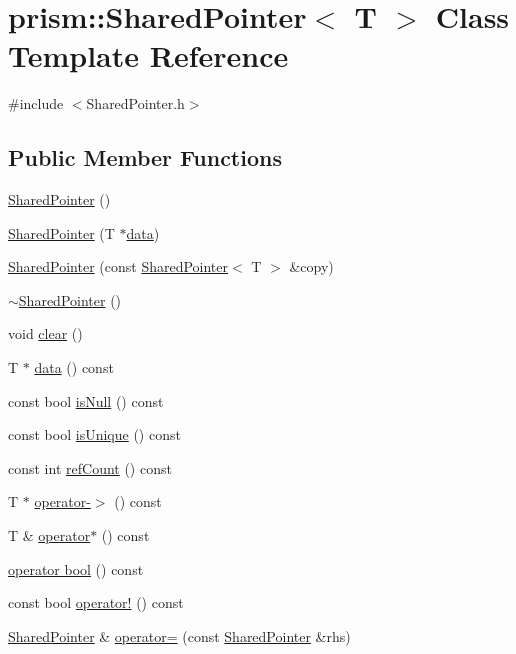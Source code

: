 \hypertarget{classprism_1_1_shared_pointer}{}\section{prism\+:\+:Shared\+Pointer$<$ T $>$ Class Template Reference}
\label{classprism_1_1_shared_pointer}


{\ttfamily \#include $<$Shared\+Pointer.\+h$>$}

\subsection*{Public Member Functions}
\begin{DoxyCompactItemize}
\item 
\hyperlink{classprism_1_1_shared_pointer_a076711618f299e5a5d04261d7d806aff}{Shared\+Pointer} ()
\item 
\hyperlink{classprism_1_1_shared_pointer_a0b8d1327178383b39bd6bb2826d384b4}{Shared\+Pointer} (T $\ast$\hyperlink{classprism_1_1_shared_pointer_aecf5f8614d4c5683e6c0207436ed8900}{data})
\item 
\hyperlink{classprism_1_1_shared_pointer_a7346c06b6c0e7c80236472c4d085460c}{Shared\+Pointer} (const \hyperlink{classprism_1_1_shared_pointer}{Shared\+Pointer}$<$ T $>$ \&copy)
\item 
\hyperlink{classprism_1_1_shared_pointer_a9892f1a766b66491af8a7356cb574ac3}{$\sim$\+Shared\+Pointer} ()
\item 
void \hyperlink{classprism_1_1_shared_pointer_a70f571a23e5c800d43f309cea9857360}{clear} ()
\item 
T $\ast$ \hyperlink{classprism_1_1_shared_pointer_aecf5f8614d4c5683e6c0207436ed8900}{data} () const 
\item 
const bool \hyperlink{classprism_1_1_shared_pointer_a011b5c5b151717cfcc45bce7eb969254}{is\+Null} () const 
\item 
const bool \hyperlink{classprism_1_1_shared_pointer_ad0eef18b3e5c37274f22cff8b88f7d66}{is\+Unique} () const 
\item 
const int \hyperlink{classprism_1_1_shared_pointer_a6b122ff924644d334ae0ff9f184af047}{ref\+Count} () const 
\item 
T $\ast$ \hyperlink{classprism_1_1_shared_pointer_a46555958394709490c4e7378c7bd2a39}{operator-\/$>$} () const 
\item 
T \& \hyperlink{classprism_1_1_shared_pointer_aef4f7418cd76f2a7b0cb20ad83e44720}{operator$\ast$} () const 
\item 
\hyperlink{classprism_1_1_shared_pointer_a1d05fe8cac7da2ea12fc321c45f59391}{operator bool} () const 
\item 
const bool \hyperlink{classprism_1_1_shared_pointer_a6a9e94b71b5ead6c0edbc836e3babb74}{operator!} () const 
\item 
\hyperlink{classprism_1_1_shared_pointer}{Shared\+Pointer} \& \hyperlink{classprism_1_1_shared_pointer_a1cc6ec5d911e2f86c2bfe07be115cd1e}{operator=} (const \hyperlink{classprism_1_1_shared_pointer}{Shared\+Pointer} \&rhs)
\end{DoxyCompactItemize}
